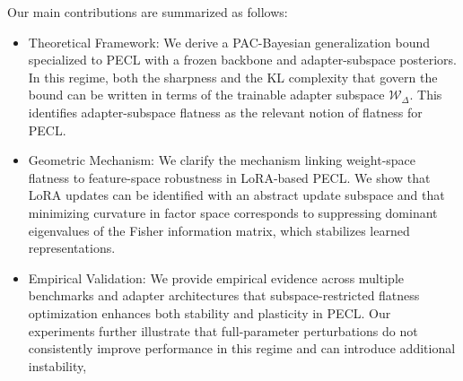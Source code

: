 \documentclass[10pt]{article} %
\begin{document}
Our main contributions are summarized as follows: 
\begin{itemize}
    \item Theoretical Framework: 
    We derive a PAC-Bayesian generalization bound specialized to PECL with a frozen backbone and adapter-subspace posteriors. In this regime, both the sharpness and the KL complexity that govern the bound can be written in terms of the trainable adapter subspace $\mathcal{W}_\Delta$. This identifies adapter-subspace flatness as the relevant notion of flatness for PECL.
    
    \item  Geometric Mechanism: 
    We clarify the mechanism linking weight-space flatness to feature-space robustness in LoRA-based PECL. We show that LoRA updates can be identified with an abstract update subspace and that minimizing curvature in factor space corresponds to suppressing dominant eigenvalues of the Fisher information matrix, which stabilizes learned representations.
    
    \item Empirical Validation: 
    We provide empirical evidence across multiple benchmarks and adapter architectures that subspace-restricted flatness optimization enhances both stability and plasticity in PECL. Our experiments further illustrate that full-parameter perturbations do not consistently improve performance in this regime and can introduce additional instability,
\end{itemize}
\end{document}
